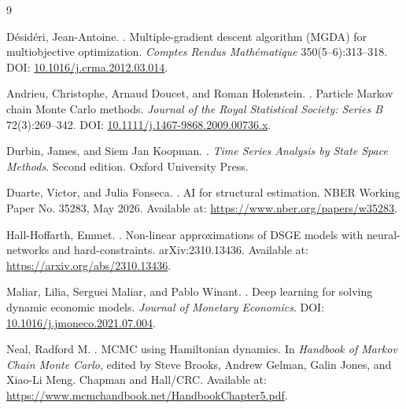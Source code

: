 \documentclass[11pt]{article}
\newcommand{\1}{\mathbf{1}}
\begin{document}
\begin{thebibliography}{9}

D{\'e}sid{\'e}ri, Jean-Antoine.
.
\newblock Multiple-gradient descent algorithm ({MGDA}) for multiobjective
optimization.
\newblock \emph{Comptes Rendus Math{\'e}matique} 350(5--6):313--318.
\newblock DOI:
\href{https://doi.org/10.1016/j.crma.2012.03.014}{10.1016/j.crma.2012.03.014}.

Andrieu, Christophe, Arnaud Doucet, and Roman Holenstein.
.
\newblock Particle Markov chain Monte Carlo methods.
\newblock \emph{Journal of the Royal Statistical Society: Series B}
72(3):269--342.
\newblock DOI:
\href{https://doi.org/10.1111/j.1467-9868.2009.00736.x}{10.1111/j.1467-9868.2009.00736.x}.

Durbin, James, and Siem Jan Koopman.
.
\newblock \emph{Time Series Analysis by State Space Methods}.
\newblock Second edition. Oxford University Press.

Duarte, Victor, and Julia Fonseca.
.
\newblock AI for structural estimation.
\newblock NBER Working Paper No. 35283, May 2026.
\newblock Available at:
\href{https://www.nber.org/papers/w35283}{https://www.nber.org/papers/w35283}.

Hall-Hoffarth, Emmet.
.
\newblock Non-linear approximations of DSGE models with neural-networks and
hard-constraints.
\newblock arXiv:2310.13436.
\newblock Available at:
\href{https://arxiv.org/abs/2310.13436}{https://arxiv.org/abs/2310.13436}.

Maliar, Lilia, Serguei Maliar, and Pablo Winant.
.
\newblock Deep learning for solving dynamic economic models.
\newblock \emph{Journal of Monetary Economics}.
\newblock DOI: \href{https://doi.org/10.1016/j.jmoneco.2021.07.004}{10.1016/j.jmoneco.2021.07.004}.

Neal, Radford M.
.
\newblock MCMC using Hamiltonian dynamics.
\newblock In \emph{Handbook of Markov Chain Monte Carlo}, edited by Steve
Brooks, Andrew Gelman, Galin Jones, and Xiao-Li Meng. Chapman and Hall/CRC.
\newblock Available at:
\href{https://www.mcmchandbook.net/HandbookChapter5.pdf}{https://www.mcmchandbook.net/HandbookChapter5.pdf}.


\end{thebibliography}
\end{document}
